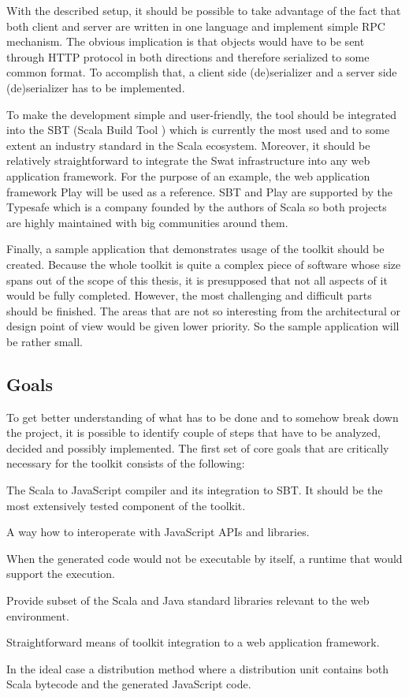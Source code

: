 \documentclass[12pt,a4paper]{report}
\begin{document}
With the described setup, it should be possible to take advantage of the fact that both client and server are written in one language and implement simple RPC mechanism. The obvious implication is that objects would have to be sent through HTTP protocol in both directions and therefore serialized to some common format. To accomplish that, a client side (de)serializer and a server side (de)serializer has to be implemented.

To make the development simple and user-friendly, the tool should be integrated into the SBT (Scala Build Tool \cite{Sbt}) which is currently the most used and to some extent an industry standard in the Scala ecosystem. Moreover, it should be relatively straightforward to integrate the Swat infrastructure into any web application framework. For the purpose of an example, the web application framework Play \cite{Play} will be used as a reference. SBT and Play are supported by the Typesafe \cite{Typesafe} which is a company founded by the authors of Scala so both projects are highly maintained with big communities around them.

Finally, a sample application that demonstrates usage of the toolkit should be created. Because the whole toolkit is quite a complex piece of software whose size spans out of the scope of this thesis, it is presupposed that not all aspects of it would be fully completed. However, the most challenging and difficult parts should be finished. The areas that are not so interesting from the architectural or design point of view would be given lower priority. So the sample application will be rather small.

\subsection{Goals}

To get better understanding of what has to be done and to somehow break down the project, it is possible to identify couple of steps that have to be analyzed, decided and possibly implemented. The first set of core goals that are critically necessary for the toolkit consists of the following:

\begin{description}[style=multiline,leftmargin=5cm]
\item[1 - Compiler] The Scala to JavaScript compiler and its integration to SBT. It should be the most extensively tested component of the toolkit.
\item[2 - Interoperability] A way how to interoperate with JavaScript APIs and libraries.
\item[3 - Runtime] When the generated code would not be executable by itself, a runtime that would support the execution.
\item[4 - Libraries] Provide subset of the Scala and Java standard libraries relevant to the web environment.
\item[5 - Integration] Straightforward means of toolkit integration to a web application framework.
\item[6 - Distribution] In the ideal case a distribution method where a distribution unit contains both Scala bytecode and the generated JavaScript code.
\end{description}
\end{document}
